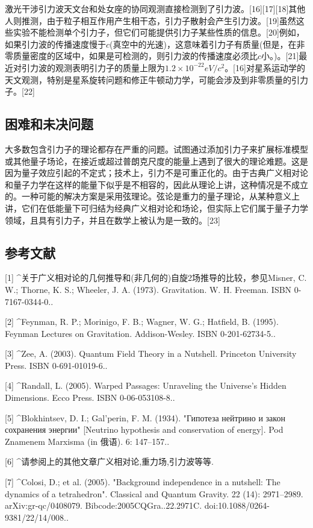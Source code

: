 激光干涉引力波天文台和处女座的协同观测直接检测到了引力波。[16][17][18]其他人则推测，由于粒子相互作用产生相干态，引力子散射会产生引力波。[19]虽然这些实验不能检测单个引力子，但它们可能提供引力子某些性质的信息。[20]例如，如果引力波的传播速度慢于$c$(真空中的光速)，这意味着引力子有质量(但是，在非零质量密度的区域中，如果是可检测的，则引力波的传播速度必须比$c$小。)。[21]最近对引力波的观测表明引力子的质量上限为$1.2\times10^{-22} eV/c^{2}$。[16]对星系运动学的天文观测，特别是星系旋转问题和修正牛顿动力学，可能会涉及到非零质量的引力子。[22]

\subsection{困难和未决问题}
大多数包含引力子的理论都存在严重的问题。试图通过添加引力子来扩展标准模型或其他量子场论，在接近或超过普朗克尺度的能量上遇到了很大的理论难题。这是因为量子效应引起的不定式；技术上，引力不是可重正化的。由于古典广义相对论和量子力学在这样的能量下似乎是不相容的，因此从理论上讲，这种情况是不成立的。一种可能的解决方案是采用弦理论。弦论是重力的量子理论，从某种意义上讲，它们在低能量下可归结为经典广义相对论和场论，但实际上它们属于量子力学领域，且具有引力子，并且在数学上被认为是一致的。[23]

\subsection{参考文献}
[1]
^关于广义相对论的几何推导和(非几何的)自旋2场推导的比较，参见Misner, C. W.; Thorne, K. S.; Wheeler, J. A. (1973). Gravitation. W. H. Freeman. ISBN 0-7167-0344-0..

[2]
^Feynman, R. P.; Morinigo, F. B.; Wagner, W. G.; Hatfield, B. (1995). Feynman Lectures on Gravitation. Addison-Wesley. ISBN 0-201-62734-5..

[3]
^Zee, A. (2003). Quantum Field Theory in a Nutshell. Princeton University Press. ISBN 0-691-01019-6..

[4]
^Randall, L. (2005). Warped Passages: Unraveling the Universe's Hidden Dimensions. Ecco Press. ISBN 0-06-053108-8..

[5]
^Blokhintsev, D. I.; Gal'perin, F. M. (1934). "Гипотеза нейтрино и закон сохранения энергии" [Neutrino hypothesis and conservation of energy]. Pod Znamenem Marxisma (in 俄语). 6: 147–157..

[6]
^请参阅上的其他文章广义相对论,重力场,引力波等等.

[7]
^Colosi, D.; et al. (2005). "Background independence in a nutshell: The dynamics of a tetrahedron". Classical and Quantum Gravity. 22 (14): 2971–2989. arXiv:gr-qc/0408079. Bibcode:2005CQGra..22.2971C. doi:10.1088/0264-9381/22/14/008..

